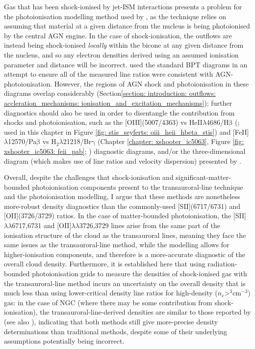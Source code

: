 Gas that has been shock-ionised by jet-ISM interactions presents a problem for the photoionisation modelling method used by \citet{Revalski2021}, as the technique relies on assuming that material at a given distance from the nucleus is being photoionised by the central AGN engine. In the case of shock-ionisation, the outflows are instead being shock-ionised \textit{locally} within the bicone at any given distance from the nucleus, and so any electron densities derived using an assumed ionisation parameter and distance will be incorrect. \citet{Revalski2021} used the standard BPT diagrams \citep{Baldwin1981} in an attempt to ensure all of the measured line ratios were consistent with AGN-photoionisation. However, the regions of AGN shock and photoionisation in these diagrams overlap considerably (Section\;\ref{section: introduction: outflows: accleration_mechanisms: ionisation_and_excitation_mechanisms}); further diagnostics should also be used in order to disentangle the contribution from shocks and photoionisation, such as the [OIII](5007/4363) vs HeII$\lambda$4686/H$\mathrm{\beta}$ (\citealt{VillarMartin1999}; used in this chapter in Figure \ref{fig: stis_seyferts: oiii_heii_hbeta_stis}) and [FeII]$\lambda$12570/Pa$\mathrm{\beta}$ vs H$_2\lambda$21218/Br$\mathrm{\gamma}$ (Chapter \ref{chapter: xshooter_ic5063}, Figure \ref{fig: xshooter_ic5063: feii_pab}; \citealt{Rodriguez-Ardila2005, Riffel2013a, Colina2015, Riffel2021}) diagnostic diagrams, and/or the three-dimensional diagram (which makes use of line ratios and velocity dispersion) presented by \citet{DAgostino2019}.

Overall, despite the challenges that shock-ionisation and significant-matter-bounded photoionisation components present to the transauroral-line technique and the \citet{Revalski2021} photoionisation modelling, I argue that these methods are nonetheless more-robust density diagnostics than the commonly-used [SII](6717/6731) and [OII](3726/3729) ratios. In the case of matter-bounded photoionisation, the [SII]$\lambda\lambda$6717,6731 and [OII]$\lambda\lambda$3726,3729 lines arise from the same part of the ionisation structure of the cloud as the transauroral lines, meaning they face the same issues as the transauroral-line method, while the \citet{Revalski2021} modelling allows for higher-ionisation components, and therefore is a more-accurate diagnostic of the overall cloud density. Furthermore, it is established here that using radiation-bounded photoionisation grids to measure the densities of shock-ionised gas with the transauroral-line method incurs an uncertainty on the overall density that is much less than using lower-critical density line ratios for high-density ($n_e$\;\textgreater{}$^{3}$\;cm$^{-3}$) gas: in the case of NGC (where there may be some contribution from shock-ionisation), the transauroral-line-derived densities are similar to those reported by \citet{Revalski2022} (see also \citealt{Crenshaw2015}), indicating that both methods still give more-precise density determinations than traditional methods, despite some of their underlying assumptions potentially being incorrect.


